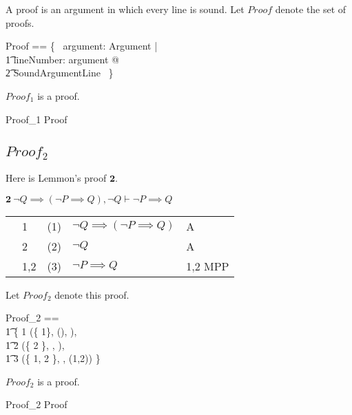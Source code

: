 \documentclass[11pt, oneside]{article}
\begin{document}
A proof is an argument in which every line is sound.
Let $Proof$ denote the set of proofs.

\begin{zed}
	Proof == \{~ argument: Argument | \\
	\t1	\forall lineNumber: \dom argument @ \\
	\t2		SoundArgumentLine ~\}
\end{zed}

\begin{example}
$Proof_1$ is a proof.

\begin{zed}
	Proof_1 \in Proof
\end{zed}

\end{example}

\subsection{$Proof_2$}

Here is Lemmon's proof $\mathbf{2}$.

\vspace{1ex}

$\mathbf{2}\ \lnot Q \implies (\lnot P \implies Q), \lnot Q \vdash \lnot P \implies Q$

\vspace{1ex}

\begin{tabular}{l l r l l}
&	1	&	(1)	&	$\lnot Q \implies (\lnot P \implies Q)$	&	A \\
&	2	&	(2)	&	$\lnot Q$						&	A \\
&	1,2	&	(3)	&	$ \lnot P \implies Q$				&	1,2 MPP
\end{tabular}

\vspace{1ex}

Let $Proof_2$ denote this proof.

\begin{zed}
	Proof_2 == \\
	\t1	\{ 1 \mapsto (\{ 1\}, \notProp \propQ \impliesProp (\notProp \propP \impliesProp \propQ), ), \\
	\t1	2 \mapsto (\{ 2 \}, \notProp \propQ, ), \\
	\t1	3 \mapsto (\{ 1, 2 \}, \notProp \propP \impliesProp \propQ, (1,2)) \}
\end{zed}

\begin{example}
$Proof_2$ is a proof.

\begin{zed}
	Proof_2 \in Proof
\end{zed}

\end{example}
\end{document}
